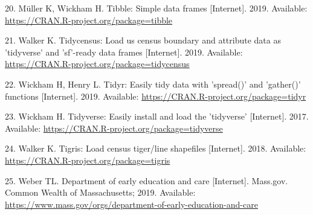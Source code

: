 \documentclass[10pt,letterpaper]{article}
\begin{document}
\hypertarget{ref-R-tibble}{}
20. Müller K, Wickham H. Tibble: Simple data frames {[}Internet{]}.
2019. Available: \url{https://CRAN.R-project.org/package=tibble}

\hypertarget{ref-R-tidycensus}{}
21. Walker K. Tidycensus: Load us census boundary and attribute data as
'tidyverse' and 'sf'-ready data frames {[}Internet{]}. 2019. Available:
\url{https://CRAN.R-project.org/package=tidycensus}

\hypertarget{ref-R-tidyr}{}
22. Wickham H, Henry L. Tidyr: Easily tidy data with 'spread()' and
'gather()' functions {[}Internet{]}. 2019. Available:
\url{https://CRAN.R-project.org/package=tidyr}

\hypertarget{ref-R-tidyverse}{}
23. Wickham H. Tidyverse: Easily install and load the 'tidyverse'
{[}Internet{]}. 2017. Available:
\url{https://CRAN.R-project.org/package=tidyverse}

\hypertarget{ref-R-tigris}{}
24. Walker K. Tigris: Load census tiger/line shapefiles {[}Internet{]}.
2018. Available: \url{https://CRAN.R-project.org/package=tigris}

\hypertarget{ref-weber_2019}{}
25. Weber TL. Department of early education and care {[}Internet{]}.
Mass.gov. Common Wealth of Massachusetts; 2019. Available:
\url{https://www.mass.gov/orgs/department-of-early-education-and-care}

\nolinenumbers
\end{document}
